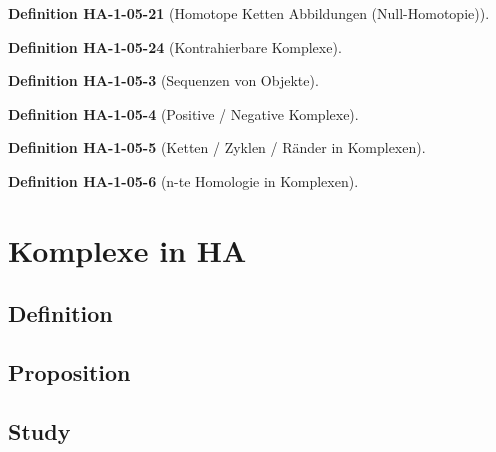 \documentclass[10pt, letterpaper]{article}
\newcommand{\CustomHeading}[3]{%
  \par\medskip\noindent%
  \textbf{#1 #2} \textnormal{(#3)}.\enskip%
}
\newenvironment{DEF}[2]{\CustomHeading{Definition}{#1}{#2}}{}
\begin{document}
\begin{DEF}{HA-1-05-21}{Homotope Ketten Abbildungen (Null-Homotopie)}

\end{DEF}

\begin{DEF}{HA-1-05-24}{Kontrahierbare Komplexe}

\end{DEF}

\begin{DEF}{HA-1-05-3}{Sequenzen von Objekte}

\end{DEF}

\begin{DEF}{HA-1-05-4}{Positive / Negative Komplexe}

\end{DEF}

\begin{DEF}{HA-1-05-5}{Ketten / Zyklen / Ränder in Komplexen}

\end{DEF}

\begin{DEF}{HA-1-05-6}{n-te Homologie in Komplexen}

\end{DEF}




















\section{Komplexe in HA}

\subsection{Definition}

\subsection{Proposition}

\subsection{Study}
\end{document}

